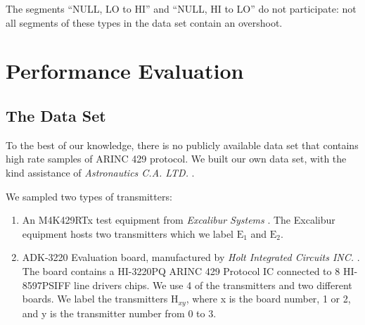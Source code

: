 \documentclass[conference]{IEEEtran}
\begin{document}
  The segments ``NULL, LO to HI'' and ``NULL, HI to LO'' do not participate: not all segments of these types in the data set contain an overshoot.
  
  \begin{table}
    \caption{Number of Features per Segment Type}
    \label{tab:feature_set_sizes}
    \centering
  \end{table}
  
 
\section{Performance Evaluation}

\subsection{The Data Set} \label{TheDataSet}
  To the best of our knowledge, there is no publicly available data set that contains high rate samples of ARINC 429 protocol. We built our own data set, with the kind assistance of \textit{Astronautics C.A. LTD.} \cite{astronautics2019home}.
  
  We sampled two types of transmitters:
  \begin{enumerate}
     \item An M4K429RTx test equipment from \textit{Excalibur Systems} \cite{excalibur2019m4k429rtx}. The Excalibur equipment hosts two transmitters which we label \(\text{E}_1\) and \(\text{E}_2\).
     \item ADK-3220 Evaluation board, manufactured by \textit{Holt Integrated Circuits INC.} \cite{holt2019evaluation}. The board contains a HI-3220PQ ARINC 429 Protocol IC connected to 8 HI-8597PSIFF line drivers chips. We use 4 of the transmitters and two different boards. We label the transmitters \(\text{H}_{xy}\), where x is the board number, 1 or 2, and y is the transmitter number from 0 to 3.
  \end{enumerate}
  
\end{document}
